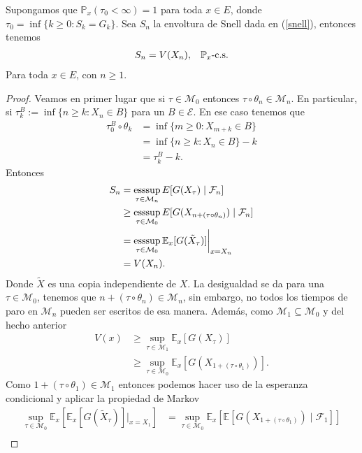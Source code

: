 \begin{lemma}
Supongamos que $\mathbb{P}_x(\tau_0 < \infty) = 1$ para toda $x \in E$, donde $\tau_0 = \inf \{k \geq 0 : S_k = G_k\}$. Sea $S_n$ la envoltura de Snell dada en (\ref{snell}), entonces tenemos
	\begin{align}
	S_n = V(X_n), \hspace{0.3cm} \mathbb{P}_x\text{-c.s.} \label{abt}
	\end{align}
Para toda $x \in E$, con $n \geq 1$.
\end{lemma}
\begin{proof}
Veamos en primer lugar que si $\tau \in \mathcal{M}_0$ entonces $\tau \circ \theta_n \in \mathcal{M}_n$. En particular, si $\tau_k^B := \inf \{n \geq k : X_n \in B\}$ para un $B \in \mathcal{E}$. En ese caso tenemos que
	\begin{align*}
	\tau_0^B \circ \theta_k & = \inf \{m \geq 0 : X_{m+k} \in B\} \\
	& = \inf \{n \geq k : X_n \in B\} - k \\
	& = \tau_k^B - k.
	\end{align*}
Entonces
	\begin{align}
	S_n & =  \operatorname*{esssup}_{\tau \in \mathcal{M}_n} E[G(X_\tau) \mid \mathcal{F}_n] \nonumber \\
	& \geq \operatorname*{esssup}_{\tau \in \mathcal{M}_0} E[G(X_{n+ (\tau \circ \theta_n)}) \mid \mathcal{F}_n] \nonumber \\
	& =  \operatorname*{esssup}_{\tau \in \mathcal{M}_0} \mathbb{E}_x [G(\tilde{X}_\tau)] \bigg|_{x = X_n} \nonumber \\
	& = V(X_n). \label{abp}
	\end{align}
Donde $\tilde{X}$ es una copia independiente de $X$. La desigualdad se da para una $\tau \in \mathcal{M}_0$, tenemos que $n+ (\tau \circ \theta_n) \in \mathcal{M}_n$, sin embargo, no todos los tiempos de paro en $\mathcal{M}_n$ pueden ser escritos de esa manera. Además, como $\mathcal{M}_1 \subseteq \mathcal{M}_0$ y del hecho anterior
	\begin{align*}
	V(x) & \geq \sup_{\tau \in \mathcal{M}_1} \mathbb{E}_x [G(X_\tau)] \\
	& \geq \sup_{\tau \in \mathcal{M}_0} \mathbb{E}_x [G(X_{1+ (\tau \circ \theta_1)})].
	\end{align*}
Como $1+ (\tau \circ \theta_1) \in \mathcal{M}_1$ entonces podemos hacer uso de la esperanza condicional y aplicar la propiedad de Markov
	\begin{align*}
	\sup_{\tau \in \mathcal{M}_0} \mathbb{E}_x \left[ \mathbb{E}_x [G(\tilde{X}_\tau)] \bigg|_{x= X_1} \right] & = \sup_{\tau \in \mathcal{M}_0} \mathbb{E}_x[\mathbb{E}[G(X_{1+ (\tau \circ \theta_1)}) \mid \mathcal{F}_1]] \\

\end{align*}
\end{proof}
